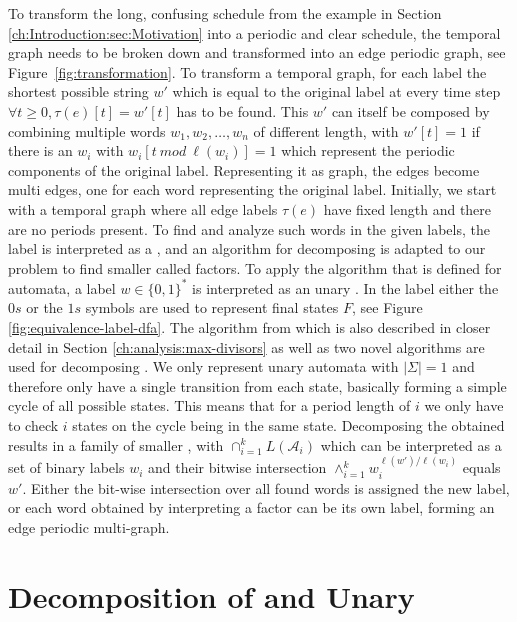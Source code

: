 To transform the long, confusing schedule from the example in Section \ref{ch:Introduction:sec:Motivation} into a periodic and clear schedule, the temporal graph needs to be broken down and transformed into an edge periodic graph, see Figure~\ref{fig:transformation}.
To transform a temporal graph, for each label the shortest possible string $w'$ which is equal to the original label at every time step $\forall t \geq 0, \tau(e)[t] = w'[t]$ has to be found.
This $w'$ can itself be composed by combining multiple words $w_1,w_2,\dots,w_n$ of different length, with $w'[t] = 1$ if there is an $w_i$ with $w_i[t~mod~\ell(w_i)] = 1$ which represent the periodic components of the original label.
Representing it as graph, the edges become multi edges, one for each word representing the original label.
Initially, we start with a temporal graph where all edge labels $\tau(e)$ have fixed length and there are no periods present.
To find and analyze such words in the given labels, the label is interpreted as a \DFA, and an algorithm for decomposing \DFAs is adapted to our problem to find smaller \DFAs called factors.
To apply the algorithm that is defined for automata, a label $ w \in \{0,1\}^*$ is interpreted as an unary \DFA.
In the label either the $0s$ or the $1s$ symbols are used to represent final states $F$, see Figure \ref{fig:equivalence-label-dfa}.
The algorithm from \cite{DBLP:journals/corr/abs-2107-04683} which is also described in closer detail in Section \ref{ch:analysis:max-divisors} as well as two novel algorithms are used for decomposing \DFAs.
We only represent unary automata with \textbf{$|\Sigma| = 1$} and therefore only have a single transition from each state, basically forming a simple cycle of all possible states.
This means that for a period length of $i$ we only have to check $i$ states on the cycle being in the same state.
Decomposing the obtained \DFA results in a family of smaller \DFAs, with $\cap^k_{i=1} L(\mathcal{A}_i)$ which can be interpreted as a set of binary labels $w_i$ and their bitwise intersection $\land^k_{i=1} w_i^{\ell(w')/\ell(w_i)}$ equals $w'$.
Either the bit-wise intersection over all found words is assigned the new label, or each word obtained by interpreting a factor can be its own label, forming an edge periodic multi-graph. 

\section{Decomposition of \DFAs and Unary \DFAs}
\label{ch:analysis:decomposition-unary-dfas}

